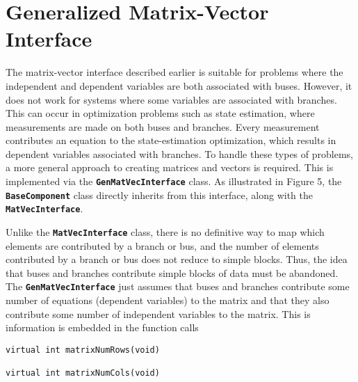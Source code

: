 \chapter{Generalized Matrix-Vector Interface}\label{gen_matvec}

The matrix-vector interface described earlier is suitable for problems where the independent and dependent variables are both associated with buses. However, it does not work for systems where some variables are associated with branches. This can occur in optimization problems such as state estimation, where measurements are made on both buses and branches. Every measurement contributes an equation to the state-estimation optimization, which results in dependent variables associated with branches. To handle these types of problems, a more general approach to creating matrices and vectors is required. This is implemented via the \texttt{\textbf{GenMatVecInterface}} class. As illustrated in Figure 5, the \texttt{\textbf{BaseComponent}} class directly inherits from this interface, along with the \texttt{\textbf{MatVecInterface}}. 

Unlike the \texttt{\textbf{MatVecInterface}} class, there is no definitive way to map which elements are contributed by a branch or bus, and the number of elements contributed by a branch or bus does not reduce to simple blocks. Thus, the idea that buses and branches contribute simple blocks of data must be abandoned. The \texttt{\textbf{GenMatVecInterface}} just assumes that buses and branches contribute some number of equations (dependent variables) to the matrix and that they also contribute some number of independent variables to the matrix. This is information is embedded in the function calls

{
\color{red}
\begin{Verbatim}[fontseries=b]
virtual int matrixNumRows(void)

virtual int matrixNumCols(void)
\end{Verbatim}
}

